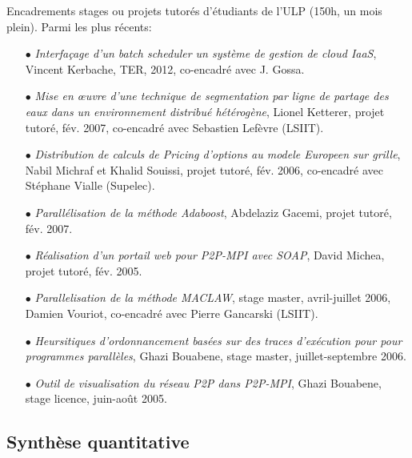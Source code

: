 \documentclass[11pt]{article}
\begin{document}
\label{sc:encadre-autres} 
Encadrements stages ou projets tutorés d'étudiants de l'ULP (150h, un mois plein). 
Parmi les plus récents:
\smallskip
\begin{itemize}
\item[$\bullet$]  {\it Interfaçage d'un batch scheduler un système de gestion 
de cloud IaaS}, Vincent Kerbache, TER, 2012, co-encadré avec J. Gossa. 
\item[$\bullet$]  {\it Mise en {\oe}uvre d'une technique de segmentation par 
ligne de partage des eaux dans un environnement distribué hétérogène}, 
Lionel Ketterer, projet tutoré, fév. 2007, co-encadré avec Sebastien 
Lefèvre (LSIIT).
\item[$\bullet$]  {\it Distribution de calculs de Pricing d'options au modele 
Europeen sur grille}, Nabil Michraf et Khalid Souissi, projet tutoré, fév. 2006, 
co-encadré avec Stéphane Vialle (Supelec).

\item[$\bullet$]  {\it Parallélisation de la méthode Adaboost}, Abdelaziz 
Gacemi, projet tutoré, fév. 2007.
\item[$\bullet$] {\it Réalisation d'un portail web pour P2P-MPI avec SOAP}, 
David Michea, projet tutoré, fév. 2005.

\item[$\bullet$] {\it Parallelisation de la méthode MACLAW}, stage master, 
avril-juillet 2006, Damien Vouriot, co-encadré avec Pierre Gancarski (LSIIT).
\item[$\bullet$] {\it Heursitiques d'ordonnancement basées sur des traces 
d'exécution pour pour programmes parallèles}, Ghazi Bouabene, stage master, 
juillet-septembre 2006.
\item[$\bullet$]  {\it Outil de visualisation du réseau P2P dans P2P-MPI}, 
Ghazi Bouabene, stage licence, juin-août 2005.
\end{itemize}





\subsection{Synthèse quantitative}
\end{document}

